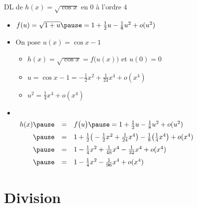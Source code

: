 \begin{frame}

\begin{exemple}
DL de $h(x)=\sqrt{\cos x}$ en $0$ à l'ordre $4$ 

\pause
\begin{itemize}
  \item $f(u)=\sqrt{1+u}\pause =1+\frac{1}{2}u-\frac{1}{8}u^2 + o(u^2)$ \pause

  \item On pose $u(x)=\cos x-1$ \pause 

  \begin{itemize}
     \item $h(x)=\sqrt{\cos x}= f\big(u(x)\big)$ et $u(0)=0$ \pause 
     \item $u=\cos x-1=-\frac{1}{2}x^2+\frac{1}{24}x^4+o(x^4)$ \pause 
     \item $u^2 = \frac{1}{4}x^4 + o(x^4)$ \pause 
  \end{itemize}

  \item  \ \\ \vspace*{-3ex}
$\begin{array}{rcl@{\vrule depth 1.2ex height 3ex width 0mm }}
h(x)\pause  & = & f\big(u\big) \pause=  1+\frac{1}{2}u-\frac{1}{8}u^2 + o(u^2) \\ \pause
     & = & 1 + \frac{1}{2}\big(-\frac{1}{2}x^2+\frac{1}{24}x^4\big)-\frac{1}{8}\big(\frac{1}{4}x^4\big) + o(x^4) \\ \pause 
     & = & 1-\frac{1}{4}x^2+\frac{1}{48}x^4 -\frac{1}{32}x^4+o(x^4) \\ \pause 
     & = & 1-\frac{1}{4}x^2-\frac{1}{96}x^4+o(x^4) \\ 
\end{array}$
\end{itemize}

\end{exemple}


\end{frame}

\section{Division}

